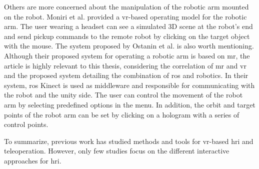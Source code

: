 Others are more concerned about the manipulation of the robotic arm mounted on the robot. Moniri et al. \cite{Moniri:2016ud} provided a \gls{vr}-based operating model for the robotic arm. The user wearing a headset can see a simulated 3D scene at the robot's end and send pickup commands to the remote robot by clicking on the target object with the mouse. The system proposed by Ostanin et al. \cite{Ostanin:2020uo} is also worth mentioning. Although their proposed system for operating a robotic arm is based on \gls{mr}, the article is highly relevant to this thesis, considering the correlation of \gls{mr} and \gls{vr} and the proposed system detailing the combination of \gls{ros} and robotics. In their system, \gls{ros} Kinect is used as middleware and responsible for communicating with the robot and the \gls{unity} side. The user can control the movement of the robot arm by selecting predefined options in the menu. In addition, the orbit and target points of the robot arm can be set by clicking on a hologram with a series of control points.

To summarize, previous work has studied methods and tools for \gls{vr}-based \gls{hri} and teleoperation. However, only few studies focus on the different interactive approaches for \gls{hri}.
